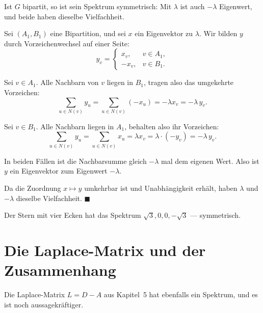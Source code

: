 \begin{merksatz}
Ist $G$ bipartit, so ist sein Spektrum symmetrisch: Mit $\lambda$ ist auch $-\lambda$ Eigenwert, und beide haben dieselbe Vielfachheit.

Sei $(A_1, B_1)$ eine Bipartition, und sei $x$ ein Eigenvektor zu $\lambda$. Wir bilden $y$ durch Vorzeichenwechsel auf einer Seite:
\[ y_v = \begin{cases} x_v, & v \in A_1,\\ -x_v, & v \in B_1. \end{cases} \]

Sei $v \in A_1$. Alle Nachbarn von $v$ liegen in $B_1$, tragen also das umgekehrte Vorzeichen:
\[ \sum_{u \in N(v)} y_u = \sum_{u \in N(v)} (-x_u) = -\lambda x_v = -\lambda\, y_v . \]

Sei $v \in B_1$. Alle Nachbarn liegen in $A_1$, behalten also ihr Vorzeichen:
\[ \sum_{u \in N(v)} y_u = \sum_{u \in N(v)} x_u = \lambda x_v = \lambda \cdot (-y_v) = -\lambda\,y_v . \]

In beiden Fällen ist die Nachbarsumme gleich $-\lambda$ mal dem eigenen Wert. Also ist $y$ ein Eigenvektor zum Eigenwert $-\lambda$.

Da die Zuordnung $x \mapsto y$ umkehrbar ist und Unabhängigkeit erhält, haben $\lambda$ und $-\lambda$ dieselbe Vielfachheit. $\blacksquare$

Der Stern mit vier Ecken hat das Spektrum $\sqrt{3}, 0, 0, -\sqrt{3}$ --- symmetrisch. \checkmark

\begin{center}
\begin{minipage}{0.88\textwidth}
\end{minipage}
\end{center}
\end{merksatz}

\section{Die Laplace-Matrix und der Zusammenhang}

Die Laplace-Matrix $L = D - A$ aus Kapitel~5 hat ebenfalls ein Spektrum, und es ist noch aussagekräftiger.

